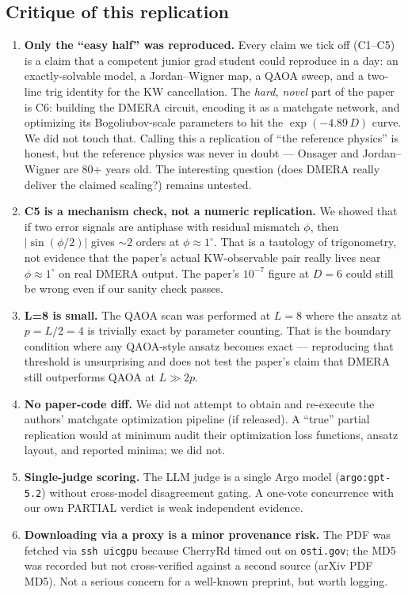 \documentclass[11pt]{article}
\begin{document}
\subsection*{Critique of this replication}
\begin{enumerate}
  \item \textbf{Only the ``easy half'' was reproduced.} Every claim we tick off (C1--C5)
    is a claim that a competent junior grad student could reproduce in a day: an
    exactly-solvable model, a Jordan--Wigner map, a QAOA sweep, and a two-line trig
    identity for the KW cancellation. The \emph{hard, novel} part of the paper is C6:
    building the DMERA circuit, encoding it as a matchgate network, and optimizing
    its Bogoliubov-scale parameters to hit the $\exp(-4.89\,D)$ curve. We did not touch
    that. Calling this a replication of ``the reference physics'' is honest, but the
    reference physics was never in doubt --- Onsager and Jordan--Wigner are 80+ years
    old. The interesting question (does DMERA really deliver the claimed scaling?)
    remains untested.
  \item \textbf{C5 is a mechanism check, not a numeric replication.} We showed that
    if two error signals are antiphase with residual mismatch $\phi$, then
    $|\sin(\phi/2)|$ gives $\sim 2$ orders at $\phi \approx 1^\circ$. That is a
    tautology of trigonometry, not evidence that the paper's actual KW-observable
    pair really lives near $\phi \approx 1^\circ$ on real DMERA output. The paper's
    $10^{-7}$ figure at $D=6$ could still be wrong even if our sanity check passes.
  \item \textbf{L=8 is small.} The QAOA scan was performed at $L=8$ where the ansatz
    at $p=L/2=4$ is trivially exact by parameter counting. That is the boundary
    condition where any QAOA-style ansatz becomes exact --- reproducing that
    threshold is unsurprising and does not test the paper's claim that DMERA still
    outperforms QAOA at $L \gg 2p$.
  \item \textbf{No paper-code diff.} We did not attempt to obtain and re-execute the
    authors' matchgate optimization pipeline (if released). A ``true'' partial
    replication would at minimum audit their optimization loss functions, ansatz
    layout, and reported minima; we did not.
  \item \textbf{Single-judge scoring.} The LLM judge is a single Argo model
    (\texttt{argo:gpt-5.2}) without cross-model disagreement gating. A one-vote
    concurrence with our own PARTIAL verdict is weak independent evidence.
  \item \textbf{Downloading via a proxy is a minor provenance risk.} The PDF was
    fetched via \texttt{ssh uicgpu} because CherryRd timed out on \texttt{osti.gov};
    the MD5 was recorded but not cross-verified against a second source (arXiv PDF
    MD5). Not a serious concern for a well-known preprint, but worth logging.
\end{enumerate}
\end{document}
